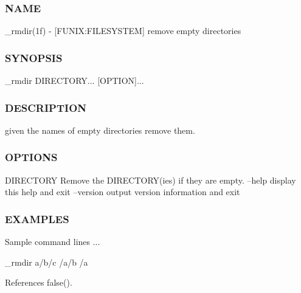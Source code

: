 \subsubsection*{N\+A\+ME}

\+\_\+rmdir(1f) -\/ \mbox{[}F\+U\+N\+IX\+:F\+I\+L\+E\+S\+Y\+S\+T\+EM\mbox{]} remove empty directories \subsubsection*{S\+Y\+N\+O\+P\+S\+IS}

\+\_\+rmdir D\+I\+R\+E\+C\+T\+O\+RY... \mbox{[}O\+P\+T\+I\+ON\mbox{]}... \subsubsection*{D\+E\+S\+C\+R\+I\+P\+T\+I\+ON}

given the names of empty directories remove them. \subsubsection*{O\+P\+T\+I\+O\+NS}

D\+I\+R\+E\+C\+T\+O\+RY Remove the D\+I\+R\+E\+C\+T\+O\+R\+Y(ies) if they are empty. --help display this help and exit --version output version information and exit \subsubsection*{E\+X\+A\+M\+P\+L\+ES}

Sample command lines ... \begin{DoxyVerb}   _rmdir a/b/c /a/b /a \end{DoxyVerb}
 

References false().

